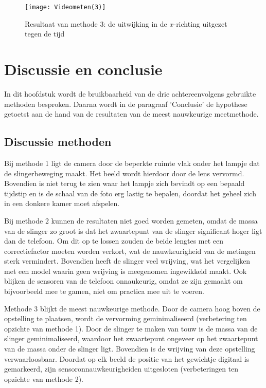\documentclass[a4paper]{article}
\begin{document}
	\begin{figure}[!h]
		\centering
		\texttt{[image: Videometen(3)]}
		\caption{Resultaat van methode 3: de uitwijking in de $x$-richting uitgezet tegen de tijd}
		\label{fig:Videometen(3)}
	\end{figure}
	
	
	
	\section{Discussie en conclusie}
	In dit hoofdstuk wordt de bruikbaarheid van de drie achtereenvolgens gebruikte methoden besproken. Daarna wordt in de paragraaf 'Conclusie' de hypothese getoetst aan de hand van de resultaten van de meest nauwkeurige meetmethode.
	
	\subsection{Discussie methoden}
	Bij methode 1 ligt de camera door de beperkte ruimte vlak onder het lampje dat de slingerbeweging maakt. Het beeld wordt hierdoor door de lens vervormd. Bovendien is niet terug te zien waar het lampje zich bevindt op een bepaald tijdstip en is de schaal van de foto erg lastig te bepalen, doordat het geheel zich in een donkere kamer moet afspelen.
	
	Bij methode 2 kunnen de resultaten niet goed worden gemeten, omdat de massa van de slinger zo groot is dat het zwaartepunt van de slinger significant hoger ligt dan de telefoon. Om dit op te lossen zouden de beide lengtes met een correctiefactor moeten worden verkort, wat de nauwkeurigheid van de metingen sterk vermindert. Bovendien heeft de slinger veel wrijving, wat het vergelijken met een model waarin geen wrijving is meegenomen ingewikkeld maakt. Ook blijken de sensoren van de telefoon onnaukeurig, omdat ze zijn gemaakt om bijvoorbeeld mee te gamen, niet om practica mee uit te voeren.
	
	Methode 3 blijkt de meest nauwkeurige methode. Door de camera hoog boven de opstelling te plaatsen, wordt de vervorming geminimaliseerd (verbetering ten opzichte van methode 1). Door de slinger te maken van touw is de massa van de slinger geminimaliseerd, waardoor het zwaartepunt ongeveer op het zwaartepunt van de massa onder de slinger ligt. Bovendien is de wrijving van deze opstelling verwaarloosbaar. Doordat op elk beeld de positie van het gewichtje digitaal is gemarkeerd, zijn sensoronnauwkeurigheiden uitgesloten (verbeteringen ten opzichte van methode 2).
	
\end{document}
